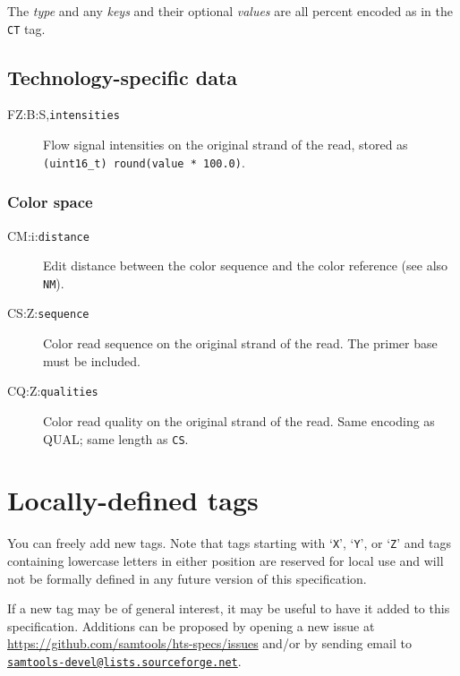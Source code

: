 \documentclass[10pt]{article}
\newcommand{\mailtourl}[1]{\href{mailto:#1}{\tt #1}}
\newcommand{\tagvalue}[1]{{\tt #1}}
\begin{document}
\begin{description}
The \emph{type} and any \emph{keys} and their optional \emph{values}
are all percent encoded as in the {\tt CT} tag.
\end{description}

\subsection{Technology-specific data}

\begin{description}
\item[FZ:B:S,\tagvalue{intensities}]
Flow signal intensities on the original strand of the read, stored as {\tt (uint16\_t) round(value * 100.0)}.
\end{description}

\subsubsection{Color space}


\begin{description}
\item[CM:i:\tagvalue{distance}]
Edit distance between the color sequence and the color reference (see also {\tt NM}).

\item[CS:Z:\tagvalue{sequence}]
Color read sequence on the original strand of the read. The primer base must be included.

\item[CQ:Z:\tagvalue{qualities}]
Color read quality on the original strand of the read. Same encoding as {\sf QUAL}; same length as {\tt CS}.
\end{description}

\section{Locally-defined tags}

You can freely add new tags.
Note that tags starting with `{\tt X}', `{\tt Y}', or `{\tt Z}' and tags
containing lowercase letters in either position are reserved for local use
and will not be formally defined in any future version of this specification.

If a new tag may be of general interest, it may be useful to have it added
to this specification.  Additions can be proposed by opening a new issue at
\url{https://github.com/samtools/hts-specs/issues} and/or by sending email
to \mailtourl{samtools-devel@lists.sourceforge.net}.
\end{document}
